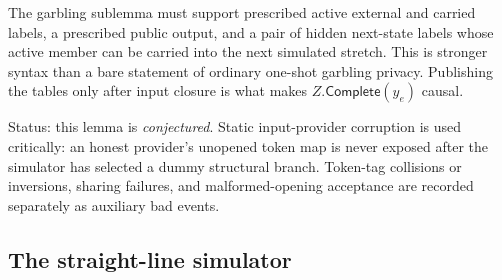 The garbling sublemma must support prescribed active external and carried
labels, a prescribed public output, and a pair of hidden next-state labels
whose active member can be carried into the next simulated stretch.  This is
stronger syntax than a bare statement of ordinary one-shot garbling privacy.
Publishing the tables only after input closure is what makes
$Z.\mathsf{Complete}(y_e)$ causal.

Status: this lemma is \emph{conjectured}.  Static input-provider corruption is
used critically: an honest provider's unopened token map is never exposed
after the simulator has selected a dummy structural branch.  Token-tag
collisions or inversions, sharing failures, and malformed-opening acceptance
are recorded separately as auxiliary bad events.

\subsection{The straight-line simulator}

